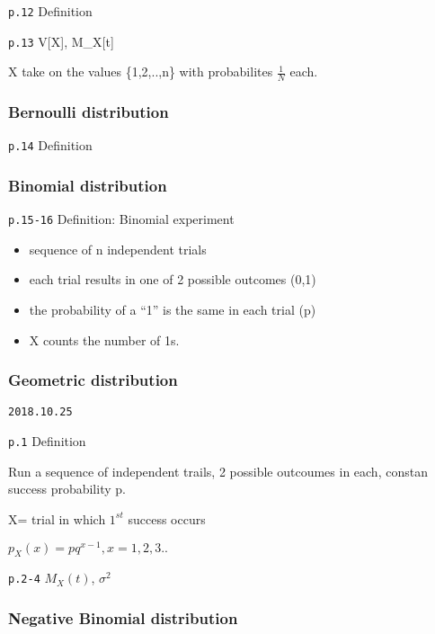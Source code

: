 \documentclass[]{tufte-book}
\providecommand{\tightlist}{%
  \setlength{\itemsep}{0pt}\setlength{\parskip}{0pt}}
\begin{document}
\texttt{p.12} Definition

\texttt{p.13} V{[}X{]}, M\_X{[}t{]}

X take on the values \{1,2,..,n\} with probabilites \(\frac1N\) each.

\hypertarget{bernoulli-distribution}{%
\subsubsection{Bernoulli distribution}\label{bernoulli-distribution}}

\texttt{p.14} Definition

\hypertarget{binomial-distribution}{%
\subsubsection{Binomial distribution}\label{binomial-distribution}}

\texttt{p.15-16} Definition: Binomial experiment

\begin{itemize}
\tightlist
\item
  sequence of n independent trials
\item
  each trial results in one of 2 possible outcomes (0,1)
\item
  the probability of a ``1'' is the same in each trial (p)
\item
  X counts the number of 1s.
\end{itemize}

\hypertarget{geometric-distribution}{%
\subsubsection{Geometric distribution}\label{geometric-distribution}}

\texttt{2018.10.25}

\texttt{p.1} Definition

Run a sequence of independent trails, 2 possible outcoumes in each,
constan success probability p.

X= trial in which \(1^{st}\) success occurs

\(p_X(x)=pq^{x-1}, x=1,2,3..\)

\texttt{p.2-4} \(M_X(t)\), \(\sigma^2\)

\hypertarget{negative-binomial-distribution}{%
\subsubsection{Negative Binomial
distribution}\label{negative-binomial-distribution}}
\end{document}
